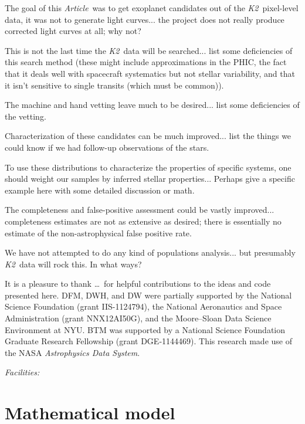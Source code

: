 \documentclass[12pt,preprint]{aastex}
\newcommand{\project}[1]{\textsl{#1}} %
\newcommand{\KT}{\project{K2}}
\newcommand{\paper}{\textsl{Article}}
\newcommand{\sectlabel}[1]{\label{sect:#1}}
\begin{document}
The goal of this \paper\ was to get exoplanet candidates out of the \KT\ pixel-level data,
it was not to generate light curves...
the project does not really produce corrected light curves at all; why not?

This is not the last time the \KT\ data will be searched...
list some deficiencies of this search method
(these might include approximations in the PHIC,
the fact that it deals well with spacecraft systematics but not stellar variability,
and that it isn't sensitive to single transits (which must be common)).

The machine and hand vetting leave much to be desired...
list some deficiencies of the vetting.

Characterization of these candidates can be much improved...
list the things we could know if we had follow-up observations of the stars.

To use these distributions to characterize the properties of specific systems,
one should weight our samples by inferred stellar properties...
Perhaps give a specific example here with some detailed discussion or math.

The completeness and false-positive assessment could be vastly improved...
completeness estimates are not as extensive as desired;
there is essentially no estimate of the non-astrophysical false positive rate.

We have not attempted to do any kind of populations analysis...
but presumably \KT\ data will rock this.  In what ways?

\acknowledgments
It is a pleasure to thank
\ldots\
for helpful contributions to the ideas and code presented here.
DFM, DWH, and DW were partially supported by the National Science Foundation (grant IIS-1124794),
the National Aeronautics and Space Administration
(grant NNX12AI50G), and the Moore--Sloan Data Science Environment at NYU.
BTM was supported by a National Science Foundation Graduate Research
Fellowship (grant DGE‐1144469).
This research made use of the NASA \project{Astrophysics Data System}.

{\it Facilities:} 



\clearpage
\appendix

\section{Mathematical model}\sectlabel{math}
\end{document}
